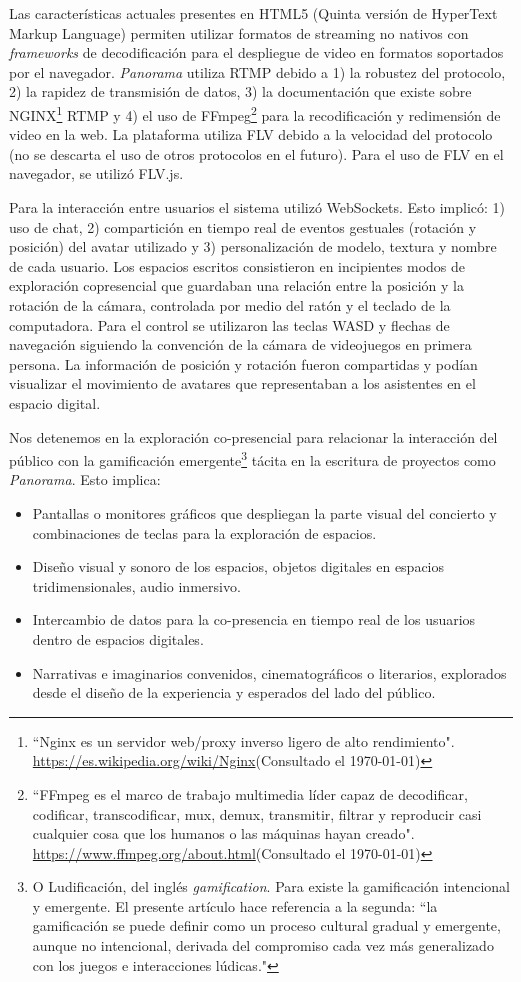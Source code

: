 Las características actuales presentes en HTML5 (Quinta versión de HyperText Markup Language) permiten utilizar formatos de streaming no nativos con \textit{frameworks} de decodificación para el despliegue de video en formatos soportados por el navegador. \textit{Panorama} utiliza RTMP debido a 1) la robustez del protocolo, 2) la rapidez de transmisión de datos, 3) la documentación que existe sobre NGINX\footnote{``Nginx es un servidor web/proxy inverso ligero de alto rendimiento". \url{https://es.wikipedia.org/wiki/Nginx}(Consultado el \today)} RTMP y 4) el uso de FFmpeg\footnote{``FFmpeg es el marco de trabajo multimedia líder capaz de decodificar, codificar, transcodificar, mux, demux, transmitir, filtrar y reproducir casi cualquier cosa que los humanos o las máquinas hayan creado". \url{https://www.ffmpeg.org/about.html}(Consultado el \today)} para la recodificación y redimensión de video en la web. La plataforma utiliza FLV debido a la velocidad del protocolo (no se descarta el uso de otros protocolos en el futuro). Para el uso de FLV en el navegador, se utilizó FLV.js. 

Para la interacción entre usuarios el sistema utilizó WebSockets. Esto implicó: 1) uso de chat, 2) compartición en tiempo real de eventos gestuales (rotación y posición) del avatar utilizado y 3) personalización de modelo, textura y nombre de cada usuario. Los espacios escritos consistieron en incipientes modos de exploración copresencial que guardaban una relación entre la posición y la rotación de la cámara, controlada por medio del ratón y el teclado de la computadora. Para el control se utilizaron las teclas WASD y flechas de navegación siguiendo la convención de la cámara de videojuegos en primera persona. La información de posición y rotación fueron compartidas y podían visualizar el movimiento de avatares que representaban a los asistentes en el espacio digital. 

Nos detenemos en la exploración co-presencial para relacionar la interacción del público con la gamificación emergente\footnote{O Ludificación, del inglés \textit{gamification}. Para \cite{gamificacion} existe la gamificación intencional y emergente. El presente artículo hace referencia a la segunda: ``la gamificación se puede definir como un proceso cultural gradual y emergente, aunque no intencional, derivada del compromiso cada vez más generalizado con los juegos e interacciones lúdicas."} tácita en la escritura de proyectos como \textit{Panorama}. Esto implica:

\begin{itemize}
\item Pantallas o monitores gráficos que despliegan la parte visual del concierto y combinaciones de teclas para la exploración de espacios.
\item Diseño visual y sonoro de los espacios, objetos digitales en espacios tridimensionales, audio inmersivo.
\item Intercambio de datos para la co-presencia en tiempo real de los usuarios dentro de espacios digitales.
\item Narrativas e imaginarios convenidos, cinematográficos o literarios, explorados desde el diseño de la experiencia y esperados del lado del público. 
\end{itemize}

